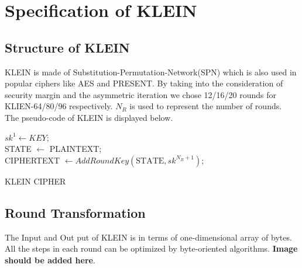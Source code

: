 \documentclass[preprint]{transcrypto}
\begin{document}
\section{Specification of KLEIN}

\subsection{Structure of KLEIN}
KLEIN is made of Substitution-Permutation-Network(SPN) which is also used in popular ciphers like AES and PRESENT. By taking into the consideration of security margin and the asymmetric iteration we chose 12/16/20 rounds for KLIEN-64/80/96 respectively. $N_{R}$ is used to represent the number of rounds.\\
The pseudo-code of KLEIN is displayed below.\\

\begin{algorithm}[H]
\SetAlgoLined
$sk^{1}\gets KEY$; \\
STATE $\gets$ PLAINTEXT;\\
 CIPHERTEXT $\gets AddRoundKey(\text{STATE}, sk^{N_{R}+1} )$;
 \caption{KLEIN CIPHER}
\end{algorithm}
\subsection{Round Transformation}
The Input and Out put of KLEIN is in terms of one-dimensional array of bytes. All the steps in each round can be optimized by byte-oriented algorithms. \textbf{Image should be added here}.
\end{document}
